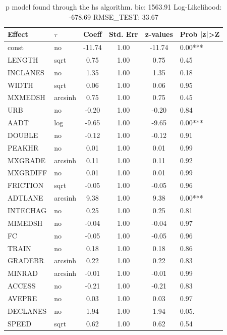 \begin{table}
	\caption{p model found through the hs algorithm. bic: 1563.91 Log-Likelihood: -678.69 RMSE_TEST: 33.67}
	\begin{center}
		\begin{tabular}{|l|l|c|c|c|l|}
			\hline
			Effect & $\tau$ & Coeff & Std. Err & z-values & Prob |z|>Z \\
			\hline
			const & no & -11.74 & 1.00 & -11.74 & 0.00*** \\
			\hline
			LENGTH & sqrt & 0.75 & 1.00 & 0.75 & 0.45 \\
			\hline
			INCLANES & no & 1.35 & 1.00 & 1.35 & 0.18 \\
			\hline
			WIDTH & sqrt & 0.06 & 1.00 & 0.06 & 0.95 \\
			\hline
			MXMEDSH & arcsinh & 0.75 & 1.00 & 0.75 & 0.45 \\
			\hline
			URB & no & -0.20 & 1.00 & -0.20 & 0.84 \\
			\hline
			AADT & log & -9.65 & 1.00 & -9.65 & 0.00*** \\
			\hline
			DOUBLE & no & -0.12 & 1.00 & -0.12 & 0.91 \\
			\hline
			PEAKHR & no & 0.01 & 1.00 & 0.01 & 0.99 \\
			\hline
			MXGRADE & arcsinh & 0.11 & 1.00 & 0.11 & 0.92 \\
			\hline
			MXGRDIFF & no & 0.01 & 1.00 & 0.01 & 0.99 \\
			\hline
			FRICTION & sqrt & -0.05 & 1.00 & -0.05 & 0.96 \\
			\hline
			ADTLANE & arcsinh & 9.38 & 1.00 & 9.38 & 0.00*** \\
			\hline
			INTECHAG & no & 0.25 & 1.00 & 0.25 & 0.81 \\
			\hline
			MIMEDSH & no & -0.04 & 1.00 & -0.04 & 0.97 \\
			\hline
			FC & no & -0.05 & 1.00 & -0.05 & 0.96 \\
			\hline
			TRAIN & no & 0.18 & 1.00 & 0.18 & 0.86 \\
			\hline
			GRADEBR & arcsinh & 0.22 & 1.00 & 0.22 & 0.83 \\
			\hline
			MINRAD & arcsinh & -0.01 & 1.00 & -0.01 & 0.99 \\
			\hline
			ACCESS & no & -0.21 & 1.00 & -0.21 & 0.83 \\
			\hline
			AVEPRE & no & 0.03 & 1.00 & 0.03 & 0.97 \\
			\hline
			DECLANES & no & 1.94 & 1.00 & 1.94 & 0.05. \\
			\hline
			SPEED & sqrt & 0.62 & 1.00 & 0.62 & 0.54 \\

\end{tabular}
\end{center}
\end{table}
